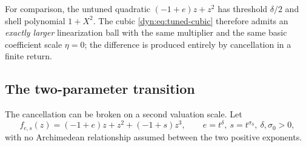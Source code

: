 \documentclass[11pt,letterpaper]{article}
\theoremstyle{definition}
\theoremstyle{remark}
\numberwithin{equation}{section}
\begin{document}
For comparison, the untuned quadratic $(-1+e)z+z^{2}$ has threshold
$\delta/2$ and shell polynomial $1+X^{2}$. The cubic
\eqref{dyn:eq:tuned-cubic} therefore admits an \emph{exactly larger}
linearization ball with the same multiplier and the same basic coefficient
scale $\eta=0$; the difference is produced entirely by cancellation in a
finite return.

\subsection{The two-parameter transition}
The cancellation can be broken on a second valuation scale. Let
\begin{equation}\label{dyn:eq:phase-family}
 f_{e,s}(z)=(-1+e)z+z^{2}+(-1+s)z^{3},
 \qquad e=t^{\delta},\ s=t^{\sigma_0},\ \delta,\sigma_0>0,
\end{equation}
with no Archimedean relationship assumed between the two positive
exponents.
\end{document}
